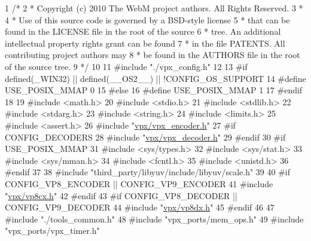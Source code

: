 \begin{DoxyCodeInclude}
1 \textcolor{comment}{/*}
2 \textcolor{comment}{ *  Copyright (c) 2010 The WebM project authors. All Rights Reserved.}
3 \textcolor{comment}{ *}
4 \textcolor{comment}{ *  Use of this source code is governed by a BSD-style license}
5 \textcolor{comment}{ *  that can be found in the LICENSE file in the root of the source}
6 \textcolor{comment}{ *  tree. An additional intellectual property rights grant can be found}
7 \textcolor{comment}{ *  in the file PATENTS.  All contributing project authors may}
8 \textcolor{comment}{ *  be found in the AUTHORS file in the root of the source tree.}
9 \textcolor{comment}{ */}
10 
11 \textcolor{preprocessor}{#include "./vpx\_config.h"}
12 
13 \textcolor{preprocessor}{#if defined(\_WIN32) || defined(\_\_OS2\_\_) || !CONFIG\_OS\_SUPPORT}
14 \textcolor{preprocessor}{#define USE\_POSIX\_MMAP 0}
15 \textcolor{preprocessor}{#else}
16 \textcolor{preprocessor}{#define USE\_POSIX\_MMAP 1}
17 \textcolor{preprocessor}{#endif}
18 
19 \textcolor{preprocessor}{#include <math.h>}
20 \textcolor{preprocessor}{#include <stdio.h>}
21 \textcolor{preprocessor}{#include <stdlib.h>}
22 \textcolor{preprocessor}{#include <stdarg.h>}
23 \textcolor{preprocessor}{#include <string.h>}
24 \textcolor{preprocessor}{#include <limits.h>}
25 \textcolor{preprocessor}{#include <assert.h>}
26 \textcolor{preprocessor}{#include "\hyperlink{vpx__encoder_8h}{vpx/vpx\_encoder.h}"}
27 \textcolor{preprocessor}{#if CONFIG\_DECODERS}
28 \textcolor{preprocessor}{#include "\hyperlink{vpx__decoder_8h}{vpx/vpx\_decoder.h}"}
29 \textcolor{preprocessor}{#endif}
30 \textcolor{preprocessor}{#if USE\_POSIX\_MMAP}
31 \textcolor{preprocessor}{#include <sys/types.h>}
32 \textcolor{preprocessor}{#include <sys/stat.h>}
33 \textcolor{preprocessor}{#include <sys/mman.h>}
34 \textcolor{preprocessor}{#include <fcntl.h>}
35 \textcolor{preprocessor}{#include <unistd.h>}
36 \textcolor{preprocessor}{#endif}
37 
38 \textcolor{preprocessor}{#include "third\_party/libyuv/include/libyuv/scale.h"}
39 
40 \textcolor{preprocessor}{#if CONFIG\_VP8\_ENCODER || CONFIG\_VP9\_ENCODER}
41 \textcolor{preprocessor}{#include "\hyperlink{vp8cx_8h}{vpx/vp8cx.h}"}
42 \textcolor{preprocessor}{#endif}
43 \textcolor{preprocessor}{#if CONFIG\_VP8\_DECODER || CONFIG\_VP9\_DECODER}
44 \textcolor{preprocessor}{#include "\hyperlink{vp8dx_8h}{vpx/vp8dx.h}"}
45 \textcolor{preprocessor}{#endif}
46 
47 \textcolor{preprocessor}{#include "./tools\_common.h"}
48 \textcolor{preprocessor}{#include "vpx\_ports/mem\_ops.h"}
49 \textcolor{preprocessor}{#include "vpx\_ports/vpx\_timer.h"}

\end{DoxyCodeInclude}
